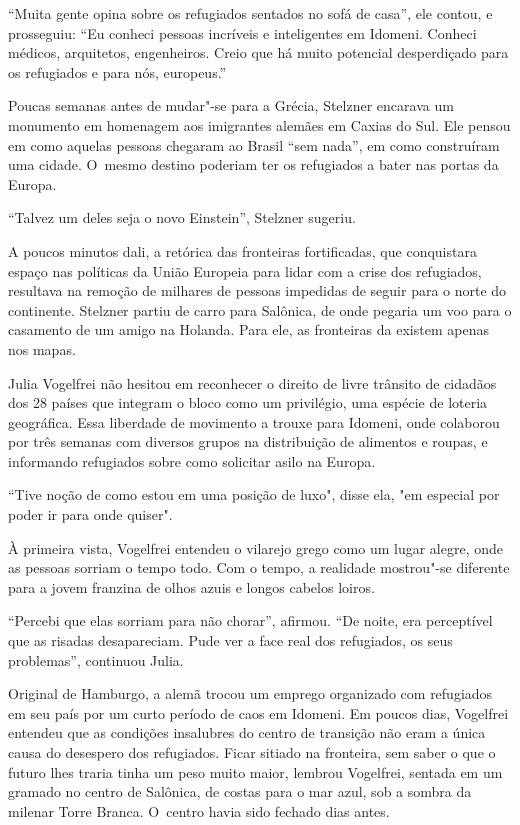 ``Muita gente opina sobre os refugiados sentados no sofá de casa'',
ele contou, e prosseguiu: ``Eu conheci pessoas incríveis e inteligentes em Idomeni.
Conheci médicos, arquitetos, engenheiros. Creio que há muito potencial
desperdiçado para os refugiados e para nós, europeus.''

Poucas semanas antes de mudar"-se para a Grécia, Stelzner encarava um
monumento em homenagem aos imigrantes alemães em Caxias do Sul. Ele
pensou em como aquelas pessoas chegaram ao Brasil ``sem nada'', em como
construíram uma cidade. O~mesmo destino poderiam ter os refugiados a
bater nas portas da Europa.

``Talvez um deles seja o novo Einstein'', Stelzner sugeriu.

A poucos minutos dali, a retórica das fronteiras fortificadas, que
conquistara espaço nas políticas da União Europeia para lidar com a
crise dos refugiados, resultava na remoção de milhares de pessoas
impedidas de seguir para o norte do continente. Stelzner partiu de
carro para Salônica, de onde pegaria um voo para o casamento de um amigo
na Holanda. Para ele, as fronteiras da  existem apenas nos mapas.

Julia Vogelfrei não hesitou em reconhecer o direito de livre trânsito de
cidadãos dos 28 países que integram o bloco como um privilégio, uma espécie de loteria geográfica. 
Essa liberdade de movimento a trouxe para Idomeni, onde
colaborou por três semanas com diversos grupos na distribuição de
alimentos e roupas, e informando refugiados sobre como solicitar asilo
na Europa.

``Tive noção de como estou em uma posição de luxo", disse ela, "em especial por poder
ir para onde quiser".

À primeira vista, Vogelfrei entendeu o vilarejo grego como um lugar
alegre, onde as pessoas sorriam o tempo todo. Com o tempo, a realidade
mostrou"-se diferente para a jovem franzina de olhos azuis e longos
cabelos loiros.

``Percebi que elas sorriam para não chorar'', afirmou. ``De noite, era
perceptível que as risadas desapareciam. Pude ver a face real dos
refugiados, os seus problemas'', continuou Julia.

Original de Hamburgo, a alemã trocou um emprego organizado com
refugiados em seu país por um curto período de caos em Idomeni. Em
poucos dias, Vogelfrei entendeu que as condições insalubres do centro de
transição não eram a única causa do desespero dos refugiados. Ficar
sitiado na fronteira, sem saber o que o futuro lhes traria tinha um
peso muito maior, lembrou Vogelfrei, sentada em um gramado no centro de
Salônica, de costas para o mar azul, sob a sombra da milenar Torre
Branca. O~centro havia sido fechado dias antes.


